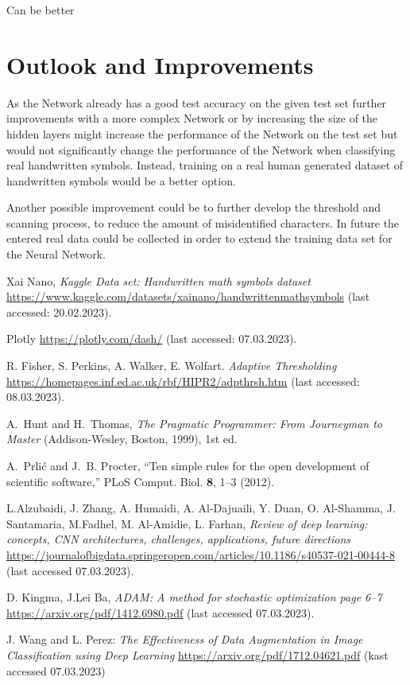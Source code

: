 \documentclass[@CLASSOPTIONS@]{tumarticle}
\begin{document}
Can be better

\section{Outlook and Improvements}

As the Network already has a good test accuracy on the given test set further improvements with a more complex Network
or by increasing the size of the hidden layers might increase the performance of the Network on the test set but would
not significantly change the performance of the Network when classifying real handwritten symbols.
Instead, training on a real human generated dataset of handwritten symbols would be a better option.

Another possible improvement could be to further develop the threshold and scanning process,
to reduce the amount of misidentified characters.
In future the entered real data could be collected in order to extend the training data set for the
Neural Network.

\begin{thebibliography}{10}
  \newcommand{\enquote}[1]{``#1''}

  Xai Nano, \emph{Kaggle Data set: Handwritten math symbols dataset}
  \url{https://www.kaggle.com/datasets/xainano/handwrittenmathsymbols}
  (last accessed: 20.02.2023).

  Plotly \url{https://plotly.com/dash/}
  (last accessed: 07.03.2023).

  R. Fisher, S. Perkins, A. Walker, E. Wolfart.
  \emph{Adaptive Thresholding}
  \url{https://homepages.inf.ed.ac.uk/rbf/HIPR2/adpthrsh.htm}
  (last accessed: 08.03.2023).

  A.~Hunt and H.~Thomas, \emph{The Pragmatic Programmer: From Journeyman to
    Master} (Addison-Wesley, Boston, 1999), 1st ed.

  A.~Prli{\'c} and J.~B. Procter, \enquote{Ten simple rules for the open
    development of scientific software,} PLoS Comput. Biol. \textbf{8}, 1--3
  (2012).

  L.Alzubaidi, J. Zhang, A. Humaidi, A. Al-Dajuaili, Y. Duan, O. Al-Shamma, J. Santamaria, M.Fadhel, M. Al-Amidie, L. Farhan,
    \emph{Review of deep learning: concepts, CNN architectures, challenges, applications, future directions}
    \url{https://journalofbigdata.springeropen.com/articles/10.1186/s40537-021-00444-8}
    (last accessed 07.03.2023).

  D. Kingma, J.Lei Ba, \emph{ADAM: A method for stochastic optimization page 6--7}
    \url{https://arxiv.org/pdf/1412.6980.pdf}
        (last accessed 07.03.2023).

  J. Wang and L. Perez: \emph{The Effectiveness of Data Augmentation in Image Classification using Deep Learning}
    \url{https://arxiv.org/pdf/1712.04621.pdf}
    (kast accessed 07.03.2023)



\end{thebibliography}
\end{document}
